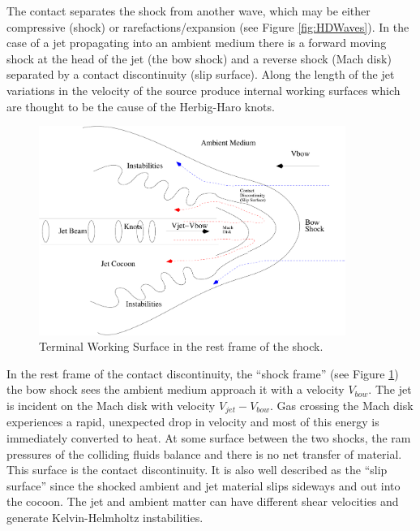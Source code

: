 The contact separates the shock from another wave, which may be either compressive (shock) or rarefactions/expansion (see Figure \ref{fig:HDWaves}).
In the case of a jet propagating into an ambient medium there is a forward moving shock at the head of the jet (the bow shock) and a reverse shock (Mach disk) separated by a contact discontinuity (slip surface).
Along the length of the jet variations in the velocity of the source produce internal working surfaces which are thought to be the cause of the Herbig-Haro knots.


\begin{figure}[t]
\centering
\includegraphics[width=10cm]{JetSchematic}
\caption{
Terminal Working Surface in the rest frame of the shock.
}
\label{fig:WorkingSurface} %
\end{figure}

In the rest frame of the contact discontinuity, the ``shock frame''
(see Figure \ref{fig:WorkingSurface})
the bow shock sees the ambient medium approach it with a velocity $V_{bow}$. The jet is incident on the Mach disk with velocity $V_{jet}-V_{bow}$. 
Gas crossing the Mach disk experiences a rapid, unexpected drop in velocity and most of this energy is immediately converted to heat. 
At some surface between the two shocks, the ram pressures of the colliding fluids balance and there is no net transfer of material. 
This surface is the contact discontinuity. 
It is also well described as the ``slip surface'' since the shocked ambient and jet material slips sideways and out into the cocoon. 
The jet and ambient matter can have different shear velocities and generate Kelvin-Helmholtz instabilities.


